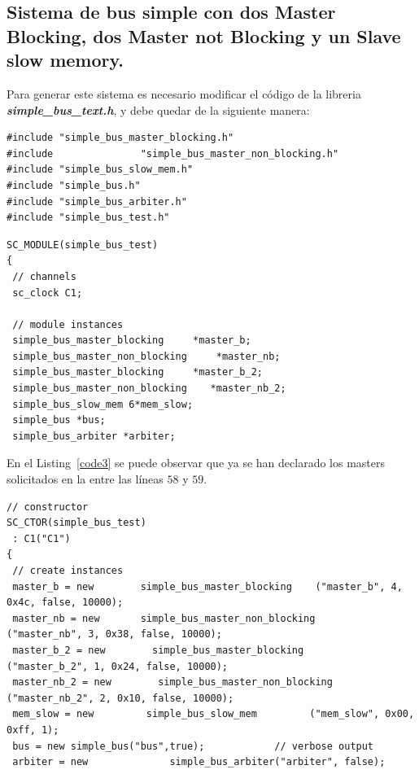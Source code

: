 \documentclass[twocolumn]{IEEEtran}
\begin{document}
\subsection{Sistema de bus simple con dos Master Blocking, dos Master not Blocking y un Slave slow memory.}
\noindent
Para generar este sistema es necesario modificar el código de la libreria \textit{\textbf{simple\_bus\_text.h}}, y debe quedar de la siguiente manera:
\lstset{numbers=left, numberstyle=\footnotesize , stepnumber=1, numbersep=1pt}
\begin{lstlisting}[firstnumber=41, caption=Código modificado en la definición de las librerías., label=code2]
#include "simple_bus_master_blocking.h"
#include               "simple_bus_master_non_blocking.h"
#include "simple_bus_slow_mem.h"
#include "simple_bus.h"
#include "simple_bus_arbiter.h"
#include "simple_bus_test.h"
\end{lstlisting}
\lstset{numbers=left, numberstyle=\footnotesize , stepnumber=1, numbersep=1pt}
\begin{lstlisting}[firstnumber=50, caption=Código modificado para la definición de las instancias., label=code3]
SC_MODULE(simple_bus_test)
{
 // channels
 sc_clock C1;

 // module instances
 simple_bus_master_blocking     *master_b;
 simple_bus_master_non_blocking     *master_nb;
 simple_bus_master_blocking     *master_b_2;
 simple_bus_master_non_blocking    *master_nb_2;
 simple_bus_slow_mem 6*mem_slow;
 simple_bus *bus;
 simple_bus_arbiter *arbiter;
\end{lstlisting}
\noindent
En el Listing~\ref{code3} se puede observar que ya se han declarado los masters solicitados en la entre las líneas $58$ y $59$.
\lstset{numbers=left, numberstyle=\footnotesize , stepnumber=1, numbersep=1pt}
\begin{lstlisting}[firstnumber=66, caption=Código modificado para la declaración del constructor., label=code4]
// constructor
SC_CTOR(simple_bus_test)
 : C1("C1")
{
 // create instances
 master_b = new        simple_bus_master_blocking    ("master_b", 4, 0x4c, false, 10000);
 master_nb = new       simple_bus_master_non_blocking      ("master_nb", 3, 0x38, false, 10000);
 master_b_2 = new        simple_bus_master_blocking        ("master_b_2", 1, 0x24, false, 10000);
 master_nb_2 = new        simple_bus_master_non_blocking        ("master_nb_2", 2, 0x10, false, 10000);
 mem_slow = new         simple_bus_slow_mem         ("mem_slow", 0x00, 0xff, 1);
 bus = new simple_bus("bus",true);            // verbose output
 arbiter = new              simple_bus_arbiter("arbiter", false);
\end{lstlisting}
\end{document}
